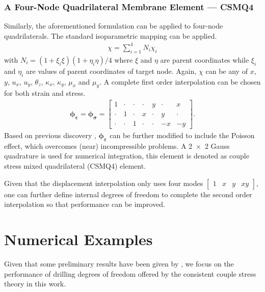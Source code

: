 \documentclass[3p,sort&compress,11pt,fleqn]{elsarticle}
\begin{document}
\subsubsection{A Four-Node Quadrilateral Membrane Element --- CSMQ4}
Similarly, the aforementioned formulation can be applied to four-node quadrilaterals. The standard isoparametric mapping can be applied.
\begin{gather}
\chi=\sum_{i=1}^4N_i\chi_i
\end{gather}
with $N_i=\left(1+\xi_i\xi\right)\left(1+\eta_i\eta\right)/4$ where $\xi$ and $\eta$ are parent coordinates while $\xi_i$ and $\eta_i$ are values of parent coordinates of target node. Again, $\chi$ can be any of $x$, $y$, $u_x$, $u_y$, $\theta_z$, $\kappa_x$, $\kappa_y$, $\mu_x$ and $\mu_y$. A complete first order interpolation can be chosen for both strain and stress.
\begin{gather}
\mathbold{\phi}_\mathbold{\varepsilon}=\mathbold{\phi}_\mathbold{\sigma}=\begin{bmatrix}
1&\cdot&\cdot&\cdot&y&\cdot&x\\\cdot&1&\cdot&x&\cdot&y&\cdot\\\cdot&\cdot&1&\cdot&\cdot&-x&-y
\end{bmatrix}.
\end{gather}
Based on previous discovery \citep{Chang2019}, $\mathbold{\phi}_\mathbold{\varepsilon}$ can be further modified to include the Poisson effect, which overcomes (near) incompressible problems. A \num{2x2} Gauss quadrature is used for numerical integration, this element is denoted as couple stress mixed quadrilateral (CSMQ4) element.

Given that the displacement interpolation only uses four modes $\begin{bmatrix}
1&x&y&xy
\end{bmatrix}$, one can further define internal degrees of freedom to complete the second order interpolation so that performance can be improved.
\section{Numerical Examples}
Given that some preliminary results have been given by \citet{Darrall2013,Pedgaonkar2021}, we focus on the performance of drilling degrees of freedom offered by the consistent couple stress theory in this work.
\end{document}
